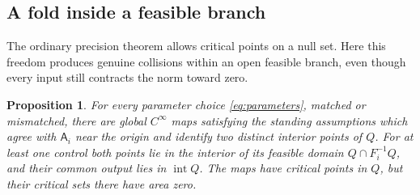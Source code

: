 \documentclass[11pt]{amsart}
\newtheorem{proposition}[theorem]{Proposition}
\theoremstyle{definition}
\theoremstyle{remark}
\numberwithin{equation}{section}
\begin{document}
\subsection{A fold inside a feasible branch}\label{sec:fold}
The ordinary precision theorem allows critical points on a null set.
Here this freedom produces genuine collisions within an open feasible
branch, even though every input still contracts the norm toward zero.
\begin{proposition}\label{prop:fold}
For every parameter choice \eqref{eq:parameters}, matched or
mismatched, there are global $C^\infty$ maps satisfying the
standing assumptions which agree with $\mathsf A_i$ near the origin
and identify two distinct interior points of $Q$. For at least
one control both points lie in the interior of its feasible domain
$Q\cap F_i^{-1}Q$, and their common output lies in $\operatorname{int}Q$.
The maps have critical points in $Q$, but their critical sets
there have area zero.
\end{proposition}
\end{document}
